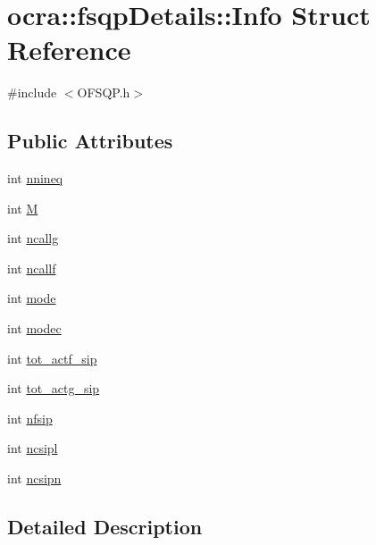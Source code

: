 \hypertarget{structocra_1_1fsqpDetails_1_1Info}{}\section{ocra\+:\+:fsqp\+Details\+:\+:Info Struct Reference}
\label{structocra_1_1fsqpDetails_1_1Info}


{\ttfamily \#include $<$O\+F\+S\+Q\+P.\+h$>$}

\subsection*{Public Attributes}
\begin{DoxyCompactItemize}
\item 
int \hyperlink{structocra_1_1fsqpDetails_1_1Info_a572f15458f6c3b8b81f924c678696ec6}{nnineq}
\item 
int \hyperlink{structocra_1_1fsqpDetails_1_1Info_af5d1d58f36a31a7f870b0d8cefcc538d}{M}
\item 
int \hyperlink{structocra_1_1fsqpDetails_1_1Info_a53623f945a6059656f89d4f1d35edf56}{ncallg}
\item 
int \hyperlink{structocra_1_1fsqpDetails_1_1Info_a81009ab1566b4f6ee06d6b3872750bd7}{ncallf}
\item 
int \hyperlink{structocra_1_1fsqpDetails_1_1Info_a67a52237ba860d5bc9d28240d454d8a0}{mode}
\item 
int \hyperlink{structocra_1_1fsqpDetails_1_1Info_a62dcde0a7a324e41c4a6aa12ae7b7c8b}{modec}
\item 
int \hyperlink{structocra_1_1fsqpDetails_1_1Info_aecb279d743b3d3e18eadbea7c0998a94}{tot\+\_\+actf\+\_\+sip}
\item 
int \hyperlink{structocra_1_1fsqpDetails_1_1Info_ae08ce33371d07fc406b18a9d7b58dabc}{tot\+\_\+actg\+\_\+sip}
\item 
int \hyperlink{structocra_1_1fsqpDetails_1_1Info_a309b89a12115813b86319bb50d44280a}{nfsip}
\item 
int \hyperlink{structocra_1_1fsqpDetails_1_1Info_a169344170f74a68e9dc33bbe6dfa2b46}{ncsipl}
\item 
int \hyperlink{structocra_1_1fsqpDetails_1_1Info_a42af0d47184a8148d96a911bde48a540}{ncsipn}
\end{DoxyCompactItemize}


\subsection{Detailed Description}


